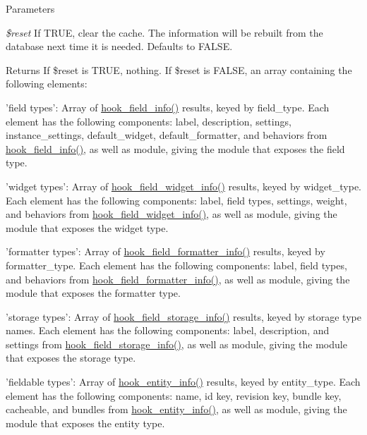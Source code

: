 \begin{DoxyParams}{Parameters}
\item[{\em \$reset}]If TRUE, clear the cache. The information will be rebuilt from the database next time it is needed. Defaults to FALSE.\end{DoxyParams}
\begin{DoxyReturn}{Returns}
If \$reset is TRUE, nothing. If \$reset is FALSE, an array containing the following elements:
\begin{DoxyItemize}
\item 'field types': Array of \hyperlink{group__field__types_gad3eb779f26f41b520f19af011ece3eb1}{hook\_\-field\_\-info()} results, keyed by field\_\-type. Each element has the following components: label, description, settings, instance\_\-settings, default\_\-widget, default\_\-formatter, and behaviors from \hyperlink{group__field__types_gad3eb779f26f41b520f19af011ece3eb1}{hook\_\-field\_\-info()}, as well as module, giving the module that exposes the field type.
\item 'widget types': Array of \hyperlink{group__field__widget_gac53aa6c2a4ac1215660d25b5d7f20792}{hook\_\-field\_\-widget\_\-info()} results, keyed by widget\_\-type. Each element has the following components: label, field types, settings, weight, and behaviors from \hyperlink{group__field__widget_gac53aa6c2a4ac1215660d25b5d7f20792}{hook\_\-field\_\-widget\_\-info()}, as well as module, giving the module that exposes the widget type.
\item 'formatter types': Array of \hyperlink{group__field__formatter_ga2f5aa1c7455f55dffd84a48efa57f987}{hook\_\-field\_\-formatter\_\-info()} results, keyed by formatter\_\-type. Each element has the following components: label, field types, and behaviors from \hyperlink{group__field__formatter_ga2f5aa1c7455f55dffd84a48efa57f987}{hook\_\-field\_\-formatter\_\-info()}, as well as module, giving the module that exposes the formatter type.
\item 'storage types': Array of \hyperlink{group__field__storage_gadc5bfde3133504e946bb0aae8babe6f3}{hook\_\-field\_\-storage\_\-info()} results, keyed by storage type names. Each element has the following components: label, description, and settings from \hyperlink{group__field__storage_gadc5bfde3133504e946bb0aae8babe6f3}{hook\_\-field\_\-storage\_\-info()}, as well as module, giving the module that exposes the storage type.
\item 'fieldable types': Array of \hyperlink{group__hooks_gaf02318e9d0e8cdbf6d187b271b9969a8}{hook\_\-entity\_\-info()} results, keyed by entity\_\-type. Each element has the following components: name, id key, revision key, bundle key, cacheable, and bundles from \hyperlink{group__hooks_gaf02318e9d0e8cdbf6d187b271b9969a8}{hook\_\-entity\_\-info()}, as well as module, giving the module that exposes the entity type. 
\end{DoxyItemize}
\end{DoxyReturn}
